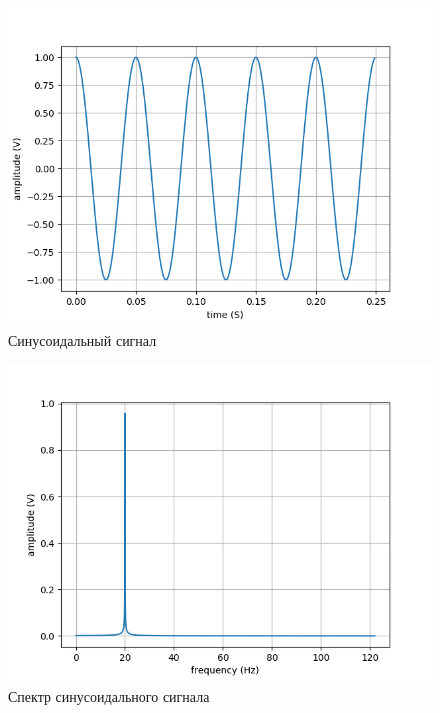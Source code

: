 \begin{figure}[H]
	\begin{center}
		\includegraphics[scale=0.7]{../out/sine_time.png}
		\caption{Синусоидальный сигнал} 
		\label{pic:sine_time} %
	\end{center}
\end{figure}

\begin{figure}[H]
	\begin{center}
		\includegraphics[scale=0.7]{../out/sine_freq.png}
		\caption{Спектр синусоидального сигнала} 
		\label{pic:sine_freq} %
	\end{center}
\end{figure}

